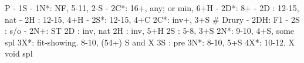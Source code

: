 P - 1S -
1N*: NF, 5-11, 2-S
   - 2C*: 16+, any; or min, 6+H
        - 2D*: 8+
   - 2D : 12-15, nat
   - 2H : 12-15, 4+H
   - 2S*: 12-15, 4+C
2C*: inv+, 3+S  # Drury
   - 2DH: F1
   - 2S : s/o
   - 2N+: ST
2D : inv, nat
2H : inv, 5+H
2S : 5-8, 3+S
2N*: 9-10, 4+S, some spl
3X*: fit-showing. 8-10, (54+) S and X
3S : pre
3N*: 8-10, 5+S
4X*: 10-12, X void spl